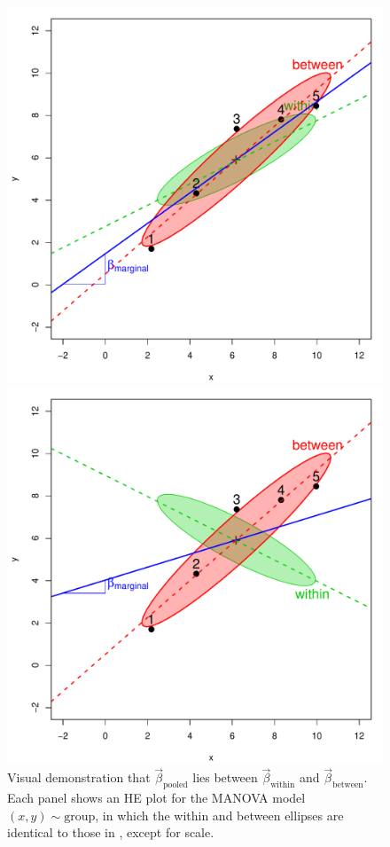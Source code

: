 \begin{figure}[htb]
 \begin{minipage}[b]{.49\linewidth}
  \centering
  \includegraphics[width=1\linewidth]{fig/between-HE1}
 \end{minipage}%
 \hfill
 \begin{minipage}[b]{.49\linewidth}
  \centering
  \includegraphics[width=1\linewidth]{fig/between-HE2}
 \end{minipage}
  \caption{Visual demonstration that $\vec{\beta}_{\textrm{pooled}}$ lies between $\vec{\beta}_{\textrm{within}}$ and $\vec{\beta}_{\textrm{between}}$.
  Each panel shows an HE plot for the MANOVA model $(x, y) \sim \textrm{group}$, in which the within and between ellipses are identical to
  those in , except for scale.}
  \label{fig:between-HE}
\end{figure}

